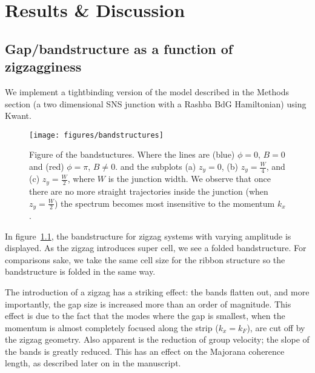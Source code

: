 \chapter{Results \& Discussion}
	
	\section{Gap/bandstructure as a function of zigzagginess}
		We implement a tightbinding version of the model described in the Methods section (a two dimensional SNS junction with a Rashba BdG Hamiltonian) using Kwant.

		\begin{figure}[!htb]
		\texttt{[image: figures/bandstructures]}
		\caption{Figure of the bandstuctures.
		Where the lines are (blue) $\phi=0$, $B=0$ and (red) $\phi=\pi$, $B \ne 0$.
		and the subplots (a) $z_y=0$, (b) $z_y=\frac{W}{4}$, and (c) $z_y=\frac{W}{2}$, where $W$ is the junction width.
		We observe that once there are no more straight trajectories inside the junction (when $z_y=\frac{W}{2}$) the spectrum becomes most insensitive to the momentum $k_x$.
		\label{fig:bandstuctures}}
		\end{figure}

		In figure~\ref{fig:bandstuctures}, the bandstructure for zigzag systems with varying amplitude is displayed.
		As the zigzag introduces super cell, we see a folded bandstructure.
		For comparisons sake, we take the same cell size for the ribbon structure so the bandstructure is folded in the same way.

		The introduction of a zigzag has a striking effect: the bands flatten out, and more importantly, the gap size is increased more than an order of magnitude.
		This effect is due to the fact that the modes where the gap is smallest, when the momentum is almost completely focused along the strip ($k_x=k_F$), are cut off by the zigzag geometry.
		Also apparent is the reduction of group velocity; the slope of the bands is greatly reduced.
		This has an effect on the Majorana coherence length, as described later on in the manuscript.

